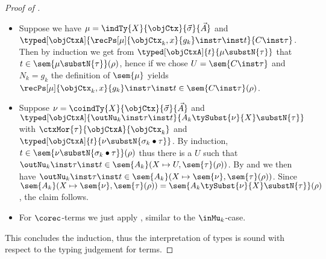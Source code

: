 \documentclass[preprint]{sigplanconf}
\begin{document}
\begin{proof}[Proof of ]
\begin{itemize}
\item Suppose we have
    $\mu = \indTy{X}{\objCtx}{\vec{\sigma}}{\vec{A}}$ and
    $\typed[\objCtxA]{\recPs[\mu]{\objCtx_k, x}{g_k} \inst \tau \inst t}{
      C \inst \tau}$.
    Then by induction we get from $\typed[\objCtxA]{t}{\mu \substN{\tau}}$
    that $t \in \sem{\mu \substN{\tau}}(\rho)$, hence if we chose
    $U = \sem{C \inst \tau}$ and $N_k = g_k$
    the definition of $\sem{\mu}$ yields
    $\recPs[\mu]{\objCtx_k, x}{g_k} \inst \tau \inst t
    \in \sem{C \inst \tau}(\rho)$.
  \item Suppose
    $\nu = \coindTy{X}{\objCtx}{\vec{\sigma}}{\vec{A}}$ and
    $\typed[\objCtxA]{\outNu_k \inst \tau \inst t}{
      A_k \tySubst{\nu}{X} \substN{\tau}}$
    with $\ctxMor{\tau}{\objCtxA}{\objCtx_k}$
    and $\typed[\objCtxA]{t}{\nu \substN{\sigma_k \bullet \tau}}$.
    By induction, $t \in \sem{\nu \substN{\sigma_k \bullet \tau}}(\rho)$
    thus there is a $U$ such that
    $\outNu_k \inst \tau \inst t \in \sem{A_k}(X \mapsto U, \sem{\tau}(\rho))$.
    By  and 
    we then have
    $\outNu_k \inst \tau \inst t
    \in \sem{A_k}(X \mapsto \sem{\nu}, \sem{\tau}(\rho))$.
    Since
    $\sem{A_k}(X \mapsto \sem{\nu}, \sem{\tau}(\rho))
    = \sem{A_k \tySubst{\nu}{X} \substN{\tau}}(\rho)$,
    the claim follows.
  \item For $\corec$-terms we just apply , similar to
    the $\inMu_k$-case.
  \end{itemize}
  This concludes the induction, thus the interpretation of types is sound
  with respect to the typing judgement for terms.
\end{proof}



%
 
\end{document}
